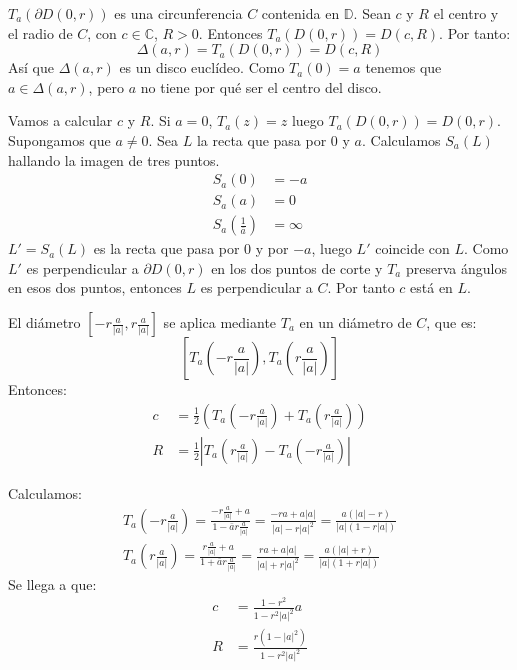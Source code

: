 $T_a(\partial D(0, r))$ es una circunferencia $C$ contenida en $\mathbb{D}$.
Sean $c$ y $R$ el centro y el radio de $C$, con $c \in \mathbb{C}$, $R > 0$.
Entonces $T_a(D(0, r)) = D(c, R)$.
Por tanto:
$$\Delta(a, r) = T_a(D(0, r)) = D(c, R)$$
Así que $\Delta(a, r)$ es un disco euclídeo.
Como $T_a(0) = a$ tenemos que $a \in \Delta(a, r)$, pero $a$ no tiene por qué ser el centro del disco.

Vamos a calcular $c$ y $R$.
Si $a = 0$, $T_a(z) = z$ luego $T_a(D(0, r)) = D(0, r)$.
Supongamos que $a \neq 0$.
Sea $L$ la recta que pasa por 0 y $a$.
Calculamos $S_a(L)$ hallando la imagen de tres puntos.
\begin{align*}
    S_a(0)                            & = -a     \\
    S_a(a)                            & = 0      \\
    S_a\left(\frac{1}{\bar{a}}\right) & = \infty
\end{align*}
$L' = S_a(L)$ es la recta que pasa por 0 y por $-a$, luego $L'$ coincide con $L$.
Como $L'$ es perpendicular a $\partial D(0, r)$ en los dos puntos de corte y $T_a$ preserva ángulos en esos dos puntos, entonces $L$ es perpendicular a $C$.
Por tanto $c$ está en $L$.

El diámetro $\left[-r\frac{a}{|a|}, r\frac{a}{|a|}\right]$ se aplica mediante $T_a$ en un diámetro de $C$, que es:
$$\left[T_a\left(-r\frac{a}{|a|}\right), T_a\left(r\frac{a}{|a|}\right)\right]$$
Entonces:
\begin{align*}
    c & = \frac{1}{2} \left(T_a\left(-r\frac{a}{|a|}\right) + T_a\left(r\frac{a}{|a|}\right)\right) \\
    R & = \frac{1}{2} \left|T_a\left(r\frac{a}{|a|}\right) - T_a\left(-r\frac{a}{|a|}\right)\right|
\end{align*}

Calculamos:
\begin{align*}
    T_a\left(-r\frac{a}{|a|}\right) = \frac{-r\frac{a}{|a|}+a}{1-\bar{a}r\frac{a}{|a|}} = \frac{-ra+a|a|}{|a|-r|a|^2} = \frac{a(|a|-r)}{|a|(1-r|a|)} \\
    T_a\left(r\frac{a}{|a|}\right) = \frac{r\frac{a}{|a|}+a}{1+\bar{a}r\frac{a}{|a|}} = \frac{ra+a|a|}{|a|+r|a|^2} = \frac{a(|a|+r)}{|a|(1+r|a|)}
\end{align*}
Se llega a que:
\begin{align*}
    c & = \frac{1-r^2}{1-r^2|a|^2}a     \\
    R & = \frac{r(1-|a|^2)}{1-r^2|a|^2}
\end{align*}

